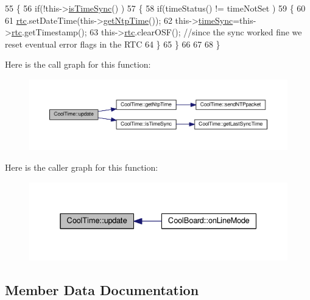 \begin{DoxyCode}
55 \{
56     \textcolor{keywordflow}{if}(!this->\hyperlink{classCoolTime_a5ae038a4498602b189f76a10bf02adf8}{isTimeSync}() )
57     \{
58         \textcolor{keywordflow}{if}(timeStatus() != timeNotSet )
59         \{
60 
61             \hyperlink{classCoolTime_afa77d58c0c21cfe8b7c27e34d82f07b9}{rtc}.setDateTime(this->\hyperlink{classCoolTime_a41fbbbfd651c2079f54d4b2911e4c705}{getNtpTime}());
62                 this->\hyperlink{classCoolTime_a9d032e76c3470a15b3bbbc52af6463f7}{timeSync}=this->\hyperlink{classCoolTime_afa77d58c0c21cfe8b7c27e34d82f07b9}{rtc}.getTimestamp();
63             this->\hyperlink{classCoolTime_afa77d58c0c21cfe8b7c27e34d82f07b9}{rtc}.clearOSF();                         \textcolor{comment}{//since the sync worked fine we reset eventual
       error flags in the RTC}
64         \}
65     \}
66     
67     
68 \}
\end{DoxyCode}
Here is the call graph for this function\+:
\nopagebreak
\begin{figure}[H]
\begin{center}
\leavevmode
\includegraphics[width=350pt]{classCoolTime_aae601f795452cfa48d9fb337aed483a8_cgraph}
\end{center}
\end{figure}
Here is the caller graph for this function\+:
\nopagebreak
\begin{figure}[H]
\begin{center}
\leavevmode
\includegraphics[width=331pt]{classCoolTime_aae601f795452cfa48d9fb337aed483a8_icgraph}
\end{center}
\end{figure}


\subsection{Member Data Documentation}
\mbox{\label{classCoolTime_a2f777da44d7ba678be8185299e9b49d1}} 
